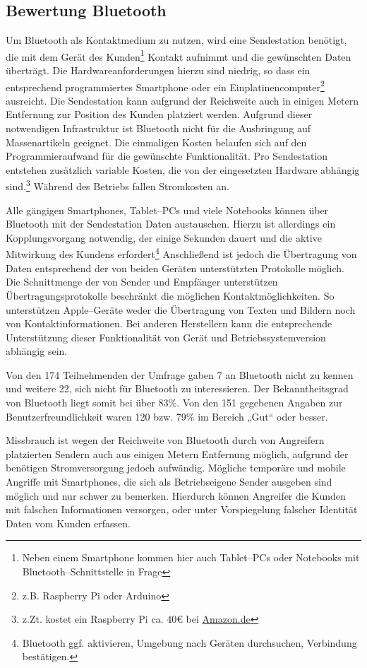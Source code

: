 \subsection{Bewertung Bluetooth} %
\label{sub:bewertung_bluetooth}
Um Bluetooth als Kontaktmedium zu nutzen, wird eine Sendestation benötigt, die mit dem Gerät des Kunden\footnote{Neben einem Smartphone kommen hier auch Tablet–PCs oder Notebooks mit Bluetooth–Schnittstelle in Frage} Kontakt aufnimmt und die gewünschten Daten überträgt. Die Hardwareanforderungen hierzu sind niedrig, so dass ein entsprechend programmiertes Smartphone oder ein Einplatinencomputer\footnote{z.B. Raspberry Pi oder Arduino} ausreicht. Die Sendestation kann aufgrund der Reichweite auch in einigen Metern Entfernung zur Position des Kunden platziert werden. Aufgrund dieser notwendigen Infrastruktur ist Bluetooth nicht für die Ausbringung auf Massenartikeln geeignet. Die einmaligen Kosten belaufen sich auf den Programmieraufwand für die gewünschte Funktionalität. Pro Sendestation entstehen zusätzlich variable Kosten, die von der eingesetzten Hardware abhängig sind.\footnote{z.Zt. kostet ein Raspberry Pi ca. 40€ bei \url{Amazon.de}} Während des Betriebs fallen Stromkosten an.

Alle gängigen Smartphones, Tablet–PCs und viele Notebooks können über Bluetooth mit der Sendestation Daten austauschen. Hierzu ist allerdings ein Kopplungsvorgang notwendig, der einige Sekunden dauert und die aktive Mitwirkung des Kundens erfordert\footnote{Bluetooth ggf. aktivieren, Umgebung nach Geräten durchsuchen, Verbindung bestätigen.} Anschließend ist jedoch die Übertragung von Daten entsprechend der von beiden Geräten unterstützten Protokolle möglich. Die Schnittmenge der von Sender und Empfänger unterstützen Übertragungsprotokolle beschränkt die möglichen Kontaktmöglichkeiten. So unterstützen Apple–Geräte weder die Übertragung von Texten und Bildern noch von Kontaktinformationen. Bei anderen Herstellern kann die entsprechende Unterstützung dieser Funktionalität von Gerät und Betriebssystemversion abhängig sein.

Von den 174 Teilnehmenden der Umfrage gaben 7 an Bluetooth nicht zu kennen und weitere 22, sich nicht für Bluetooth zu interessieren. Der Bekanntheitsgrad von Bluetooth liegt somit bei über 83\%. Von den 151 gegebenen Angaben zur Benutzerfreundlichkeit waren 120 bzw. 79\% im Bereich „Gut“ oder besser.

Missbrauch ist wegen der Reichweite von Bluetooth durch von Angreifern platzierten Sendern auch aus einigen Metern Entfernung möglich, aufgrund der benötigen Stromversorgung jedoch aufwändig. Mögliche temporäre und mobile Angriffe mit Smartphones, die sich als Betriebseigene Sender ausgeben sind möglich und nur schwer zu bemerken. Hierdurch können Angreifer die Kunden mit falschen Informationen versorgen, oder unter Vorspiegelung falscher Identität Daten vom Kunden erfassen.

